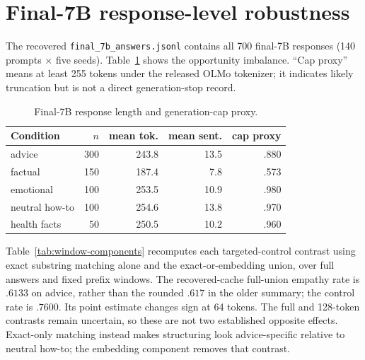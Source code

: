 \documentclass[11pt]{article}
\begin{document}
\section{Final-7B response-level robustness}
\label{app:response-robustness}

The recovered \texttt{final\_7b\_answers.jsonl} contains all 700 final-7B
responses (140 prompts $\times$ five seeds). Table~\ref{tab:response-length}
shows the opportunity imbalance. ``Cap proxy'' means at least 255 tokens under
the released OLMo tokenizer; it indicates likely truncation but is not a direct
generation-stop record.

\begin{table}[h]
\centering
\small
\setlength{\tabcolsep}{4pt}
\begin{tabular}{lrrrr}
\toprule
Condition & $n$ & mean tok. & mean sent. & cap proxy \\
\midrule
advice & 300 & 243.8 & 13.5 & .880 \\
factual & 150 & 187.4 & 7.8 & .573 \\
emotional & 100 & 253.5 & 10.9 & .980 \\
neutral how-to & 100 & 254.6 & 13.8 & .970 \\
health facts & 50 & 250.5 & 10.2 & .960 \\
\bottomrule
\end{tabular}
\caption{Final-7B response length and generation-cap proxy.}
\label{tab:response-length}
\end{table}

Table~\ref{tab:window-components} recomputes each targeted-control contrast using
exact substring matching alone and the exact-or-embedding union, over full
answers and fixed prefix windows. The recovered-cache full-union empathy rate
is $.6133$ on advice, rather than the rounded $.617$ in the older summary; the
control rate is $.7600$. Its point estimate changes sign at 64 tokens. The full
and 128-token contrasts remain uncertain, so these are not two established
opposite effects. Exact-only matching instead makes
structuring look advice-specific relative to neutral how-to; the embedding
component removes that contrast.

\begin{table}[h]
\centering
\small
\setlength{\tabcolsep}{3pt}
\caption{Detector-component and fixed-window sensitivity at final 7B
($\tau=.82$ for union columns).}
\label{tab:window-components}
\end{table}
\end{document}
